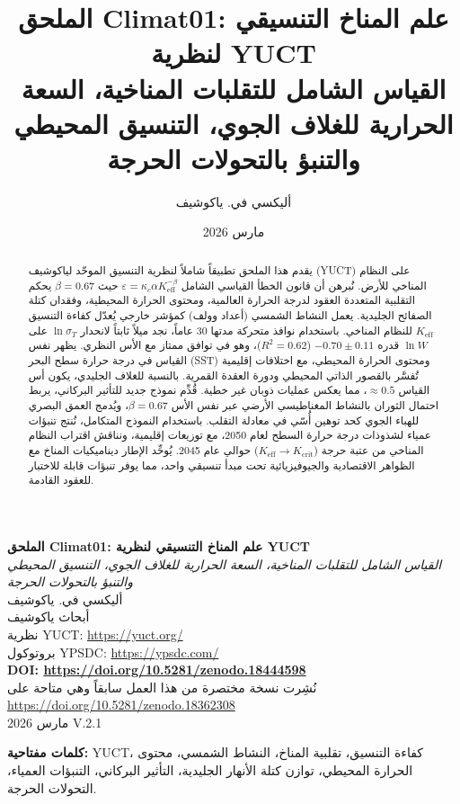 \documentclass[11pt,a4paper]{article}
\title{الملحق Climat01: علم المناخ التنسيقي لنظرية YUCT\\
	\large القياس الشامل للتقلبات المناخية، السعة الحرارية للغلاف الجوي، التنسيق المحيطي والتنبؤ بالتحولات الحرجة}
\author{أليكسي في. ياكوشيف}
\date{مارس 2026}
\begin{document}
	\sloppy
	
	\begin{titlepage}
		\centering
		\vspace*{1cm}
		{\Huge\textbf{الملحق Climat01: علم المناخ التنسيقي لنظرية YUCT}}\\[0.5cm]
		{\large\textit{القياس الشامل للتقلبات المناخية، السعة الحرارية للغلاف الجوي، التنسيق المحيطي والتنبؤ بالتحولات الحرجة}}\\[2cm]
		
		{\Large أليكسي في. ياكوشيف}\\[0.3cm]
		\large أبحاث ياكوشيف\\
		نظرية YUCT: \url{https://yuct.org/}\\
		بروتوكول YPSDC: \url{https://ypsdc.com/}\\[1cm]
		
		\textbf{DOI: \url{https://doi.org/10.5281/zenodo.18444598}}\\[0.5cm]
		
		نُشِرت نسخة مختصرة من هذا العمل سابقاً وهي متاحة على\\
		\url{https://doi.org/10.5281/zenodo.18362308}\\[0.5cm]
		مارس 2026 \quad V.2.1\\[2cm]
		
		\begin{minipage}{0.9\textwidth}
			\begin{abstract}
				\noindent
				يقدم هذا الملحق تطبيقاً شاملاً لنظرية التنسيق الموحّد لياكوشيف (YUCT) على النظام المناخي للأرض. نُبرهن أن قانون الخطأ القياسي الشامل \(\varepsilon = \kappa_c \alpha K_{\mathrm{eff}}^{-\beta}\) حيث \(\beta=0.67\) يحكم التقلبية المتعددة العقود لدرجة الحرارة العالمية، ومحتوى الحرارة المحيطية، وفقدان كتلة الصفائح الجليدية. يعمل النشاط الشمسي (أعداد وولف) كمؤشر خارجي يُعدّل كفاءة التنسيق \(K_{\mathrm{eff}}\) للنظام المناخي. باستخدام نوافذ متحركة مدتها 30 عاماً، نجد ميلاً ثابتاً لانحدار \(\ln \sigma_T\) على \(\ln W\) قدره \(-0.70\pm0.11\) (\(R^2=0.62\))، وهو في توافق ممتاز مع الأس النظري. يظهر نفس القياس في درجة حرارة سطح البحر (SST) ومحتوى الحرارة المحيطي، مع اختلافات إقليمية تُفسَّر بالقصور الذاتي المحيطي ودورة العقدة القمرية. بالنسبة للغلاف الجليدي، يكون أس القياس \(\approx 0.5\)، مما يعكس عمليات ذوبان غير خطية. قُدِّم نموذج جديد للتأثير البركاني، يربط احتمال الثوران بالنشاط المغناطيسي الأرضي عبر نفس الأس \(\beta=0.67\)، ويُدمج العمق البصري للهباء الجوي كحد توهين أُسّي في معادلة التقلب. باستخدام النموذج المتكامل، نُنتج تنبؤات عمياء لشذوذات درجة حرارة السطح لعام 2050، مع توزيعات إقليمية، ونناقش اقتراب النظام المناخي من عتبة حرجة (\(K_{\mathrm{eff}} \to K_{\mathrm{crit}}\)) حوالي عام 2045. يُوحِّد الإطار ديناميكيات المناخ مع الظواهر الاقتصادية والجيوفيزيائية تحت مبدأ تنسيقي واحد، مما يوفر تنبؤات قابلة للاختبار للعقود القادمة.
			\end{abstract}
		\end{minipage}
		
		\vfill
		\small
		\textbf{كلمات مفتاحية:} YUCT، كفاءة التنسيق، تقلبية المناخ، النشاط الشمسي، محتوى الحرارة المحيطي، توازن كتلة الأنهار الجليدية، التأثير البركاني، التنبؤات العمياء، التحولات الحرجة.
	\end{titlepage}
	
\end{document}
